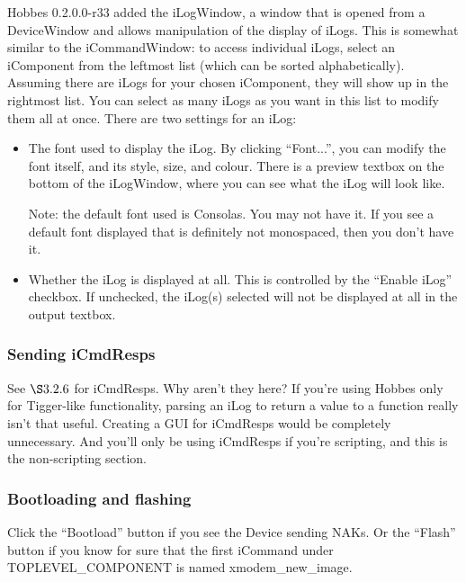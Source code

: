 Hobbes 0.2.0.0-r33 added the iLogWindow, a window that is opened from a DeviceWindow and allows manipulation of the display of iLogs. This is somewhat similar to the iCommandWindow: to access individual iLogs, select an iComponent from the leftmost list (which can be sorted alphabetically). Assuming there are iLogs for your chosen iComponent, they will show up in the rightmost list. You can select as many iLogs as you want in this list to modify them all at once. There are two settings for an iLog:

\begin{itemize}
\item The font used to display the iLog. By clicking ``Font...'', you can modify the font itself, and its style, size, and colour. There is a preview textbox on the bottom of the iLogWindow, where you can see what the iLog will look like.

Note: the default font used is Consolas. You may not have it. If you see a default font displayed that is definitely not monospaced, then you don't have it.
\item Whether the iLog is displayed at all. This is controlled by the ``Enable iLog'' checkbox. If unchecked, the iLog(s) selected will not be displayed at all in the output textbox.
\end{itemize}



%
%
\subsubsection{Sending iCmdResps}
\label{3.3.3}

See \hyperref[3.2.6]{$\S3.2.6$} for iCmdResps. Why aren't they here? If you're using Hobbes only for Tigger-like functionality, parsing an iLog to return a value to a function really isn't that useful. Creating a GUI for iCmdResps would be completely unnecessary. And you'll only be using iCmdResps if you're scripting, and this is the non-scripting section.



%
%
\subsubsection{Bootloading and flashing}
\label{3.3.4}

Click the ``Bootload'' button if you see the Device sending NAKs. Or the ``Flash'' button if you know for sure that the first iCommand under TOPLEVEL\_COMPONENT is named xmodem\_new\_image.

